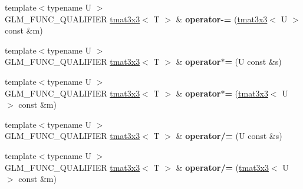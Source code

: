 \begin{DoxyCompactItemize}
\item 
\hypertarget{structglm_1_1detail_1_1tmat3x3_a19536db51bd84f4219209a0b6ef92182}{}{\footnotesize template$<$typename U $>$ }\\G\+L\+M\+\_\+\+F\+U\+N\+C\+\_\+\+Q\+U\+A\+L\+I\+F\+I\+E\+R \hyperlink{structglm_1_1detail_1_1tmat3x3}{tmat3x3}$<$ T $>$ \& {\bfseries operator-\/=} (\hyperlink{structglm_1_1detail_1_1tmat3x3}{tmat3x3}$<$ U $>$ const \&m)\label{structglm_1_1detail_1_1tmat3x3_a19536db51bd84f4219209a0b6ef92182}

\item 
\hypertarget{structglm_1_1detail_1_1tmat3x3_a6990048c6ddf16f2bd84bca0b89bb808}{}{\footnotesize template$<$typename U $>$ }\\G\+L\+M\+\_\+\+F\+U\+N\+C\+\_\+\+Q\+U\+A\+L\+I\+F\+I\+E\+R \hyperlink{structglm_1_1detail_1_1tmat3x3}{tmat3x3}$<$ T $>$ \& {\bfseries operator$\ast$=} (U const \&s)\label{structglm_1_1detail_1_1tmat3x3_a6990048c6ddf16f2bd84bca0b89bb808}

\item 
\hypertarget{structglm_1_1detail_1_1tmat3x3_a5bc7b8929e609b3f2172de98a3171695}{}{\footnotesize template$<$typename U $>$ }\\G\+L\+M\+\_\+\+F\+U\+N\+C\+\_\+\+Q\+U\+A\+L\+I\+F\+I\+E\+R \hyperlink{structglm_1_1detail_1_1tmat3x3}{tmat3x3}$<$ T $>$ \& {\bfseries operator$\ast$=} (\hyperlink{structglm_1_1detail_1_1tmat3x3}{tmat3x3}$<$ U $>$ const \&m)\label{structglm_1_1detail_1_1tmat3x3_a5bc7b8929e609b3f2172de98a3171695}

\item 
\hypertarget{structglm_1_1detail_1_1tmat3x3_aefc88ba39684548fcdad9f02f9144b65}{}{\footnotesize template$<$typename U $>$ }\\G\+L\+M\+\_\+\+F\+U\+N\+C\+\_\+\+Q\+U\+A\+L\+I\+F\+I\+E\+R \hyperlink{structglm_1_1detail_1_1tmat3x3}{tmat3x3}$<$ T $>$ \& {\bfseries operator/=} (U const \&s)\label{structglm_1_1detail_1_1tmat3x3_aefc88ba39684548fcdad9f02f9144b65}

\item 
\hypertarget{structglm_1_1detail_1_1tmat3x3_af62460353adb37ff2118b39cac0eb9d0}{}{\footnotesize template$<$typename U $>$ }\\G\+L\+M\+\_\+\+F\+U\+N\+C\+\_\+\+Q\+U\+A\+L\+I\+F\+I\+E\+R \hyperlink{structglm_1_1detail_1_1tmat3x3}{tmat3x3}$<$ T $>$ \& {\bfseries operator/=} (\hyperlink{structglm_1_1detail_1_1tmat3x3}{tmat3x3}$<$ U $>$ const \&m)\label{structglm_1_1detail_1_1tmat3x3_af62460353adb37ff2118b39cac0eb9d0}

\end{DoxyCompactItemize}
